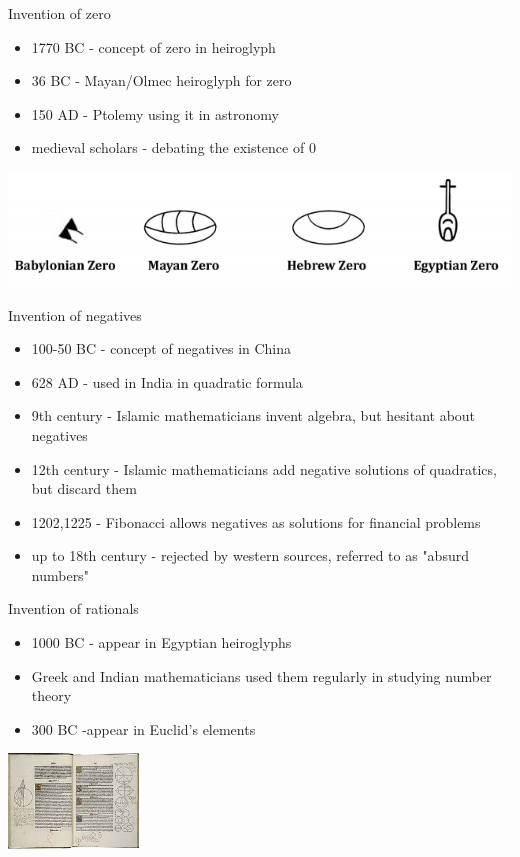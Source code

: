\documentclass{beamer}
\begin{document}
\begin{frame}{Invention of zero}
\begin{itemize}
\pause
\item 1770 BC - concept of zero in heiroglyph
\pause
\item 36 BC - Mayan/Olmec heiroglyph for zero
\pause
\item 150 AD - Ptolemy using it in astronomy
\pause
\item medieval scholars - debating the existence of $0$
\end{itemize}\vfil
\includegraphics[width=\linewidth]{fig/zeros}
\end{frame}

\begin{frame}{Invention of negatives}
\begin{itemize}
\pause
\item 100-50 BC - concept of negatives in China
\pause
\item 628 AD - used in India in quadratic formula
\pause
\item 9th century - Islamic mathematicians invent algebra, but hesitant about negatives
\pause
\item 12th century - Islamic mathematicians add negative solutions of quadratics, but discard them
\pause
\item 1202,1225 - Fibonacci allows negatives as solutions for financial problems
\pause
\item up to 18th century - rejected by western sources, referred to as "absurd numbers"
\end{itemize}
\end{frame}

\begin{frame}{Invention of rationals}
\begin{itemize}
\pause
\item 1000 BC - appear in Egyptian heiroglyphs
\pause
\item Greek and Indian mathematicians used them regularly in studying number theory
\pause
\item 300 BC -appear in Euclid's elements
\end{itemize}\vfil
\begin{center}
\includegraphics[height=1in]{fig/elements}
\end{center}
\end{frame}
\end{document}
